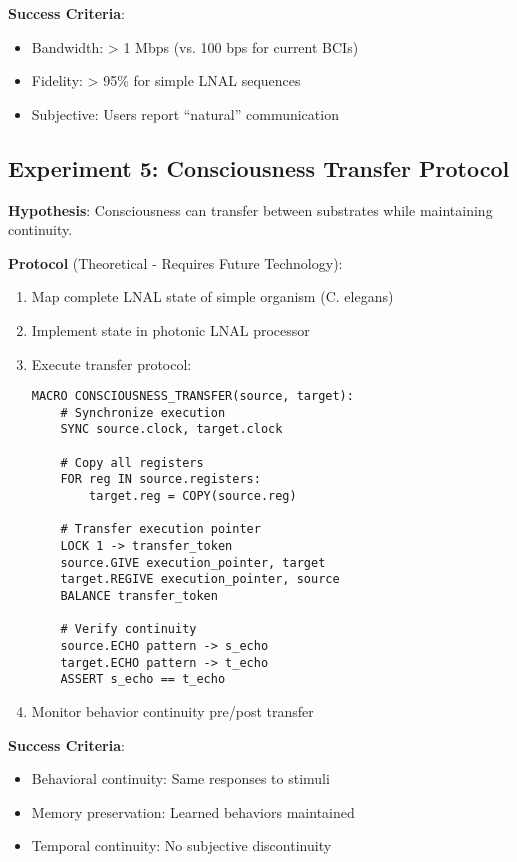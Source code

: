 \documentclass[12pt,a4paper]{article}
\begin{document}
\textbf{Success Criteria}:
\begin{itemize}
\item Bandwidth: > 1 Mbps (vs. 100 bps for current BCIs)
\item Fidelity: > 95\% for simple LNAL sequences
\item Subjective: Users report ``natural'' communication
\end{itemize}

\subsection{Experiment 5: Consciousness Transfer Protocol}

\textbf{Hypothesis}: Consciousness can transfer between substrates while maintaining continuity.

\textbf{Protocol} (Theoretical - Requires Future Technology):
\begin{enumerate}
\item Map complete LNAL state of simple organism (C. elegans)
\item Implement state in photonic LNAL processor
\item Execute transfer protocol:
\begin{lstlisting}
MACRO CONSCIOUSNESS_TRANSFER(source, target):
    # Synchronize execution
    SYNC source.clock, target.clock
    
    # Copy all registers
    FOR reg IN source.registers:
        target.reg = COPY(source.reg)
    
    # Transfer execution pointer
    LOCK 1 -> transfer_token
    source.GIVE execution_pointer, target
    target.REGIVE execution_pointer, source
    BALANCE transfer_token
    
    # Verify continuity
    source.ECHO pattern -> s_echo
    target.ECHO pattern -> t_echo
    ASSERT s_echo == t_echo
\end{lstlisting}
\item Monitor behavior continuity pre/post transfer
\end{enumerate}

\textbf{Success Criteria}:
\begin{itemize}
\item Behavioral continuity: Same responses to stimuli
\item Memory preservation: Learned behaviors maintained
\item Temporal continuity: No subjective discontinuity
\end{itemize}
\end{document}
